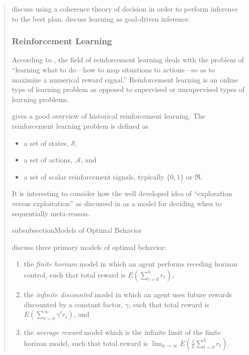 \begin{quotation}
\cite{thagard1995ibp} discuss using a coherence theory of decision in order to perform inference to the best plan.
\cite{michalski1995lgdi} discuss learning as goal-driven inference.

\subsubsection{Reinforcement Learning}

According to \cite{sutton1998rli}, the field of reinforcement learning deals with the problem of ``learning what to do---how to map situations to actions---so as to maximize a numerical reward signal.''
Reinforcement learning is an online type of learning problem as opposed to supervised or unsupervised types of learning problems.

\cite{kaelbling1996rls} gives a good overview of historical reinforcement learning.
The reinforcement learning problem is defined as

\begin{itemize}
\item{a set of states, $\mathcal{S}$,}
\item{a set of actions, $\mathcal{A}$, and}
\item{a set of scalar reinforcement signals, typically $\{0,1\}$ or $\Re$.}
\end{itemize}

It is interesting to consider how the well developed idea of ``exploration versus exploitation'' as discussed in \cite{kaelbling1996rls} as a model for deciding when to sequentially meta-reason.

subsubsection{Models of Optimal Behavior}

\cite{kaelbling1996rls} discuss three primary models of optimal behavior:

\begin{enumerate}
\item{the \emph{finite horizon} model in which an agent performs receding horizon control, such that total reward is $E(\sum_{t=0}^{h}{r_t})$,}
\item{the \emph{infinite discounted} model in which an agent uses future rewards discounted by a constant factor, $\gamma$, such that total reward is $E(\sum_{t=0}^{\infty}{\gamma^t r_t})$, and}
\item{the \emph{average reward} model which is the infinite limit of the finite horizon model, such that total reward is $\lim_{h{\rightarrow}\infty}{E(\frac{1}{h}\sum_{t=0}^{h}{r_t})}$.}
\end{enumerate}


\end{quotation}
